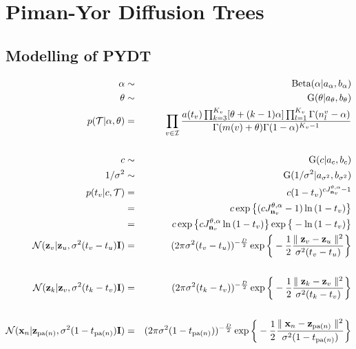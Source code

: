 \documentclass{article}
\begin{document}
\section{Piman-Yor Diffusion Trees}
\subsection{Modelling of PYDT}	

	\begin{eqnarray}
		\alpha &\sim& \textrm{Beta}(\alpha | a_\alpha, b_\alpha) \\ 
		\theta &\sim& \textrm{G}(\theta | a_\theta, b_\theta) \\
		p(\mathcal{T}|\alpha, \theta) &=& \prod_{v \in \mathcal{I}} \frac{a(t_v) \prod^{K_v}_{k=3}[\theta + (k - 1)\alpha] \prod^{K_v}_{l=1} \Gamma(n^v_l - \alpha)}{\Gamma(m(v) + \theta) \Gamma(1 - \alpha)^{K_v - 1}} \nonumber \\
		\\
		c &\sim& \textrm{G}(c | a_c, b_c) \\
		1/\sigma^2 &\sim& \textrm{G}(1/\sigma^2 | a_{\sigma^2}, b_{\sigma^2}) \\
		p(t_v | c, \mathcal{T}) &=& c(1-t_v)^{cJ^{\theta,\alpha}_{\bold{n}_v} - 1} \nonumber \\
		&=& c\exp \big\{ (cJ^{\theta,\alpha}_{\bold{n}_v} - 1)\ln{(1-t_v)} \big\} \nonumber \\
		&=& c\exp \big\{ cJ^{\theta,\alpha}_{\bold{n}_v}\ln{(1-t_v)} \big\} \exp \big\{-\ln{(1-t_v)} \big\} \\
		\mathcal{N}(\bold{z}_v | \bold{z}_u, \sigma^2(t_v - t_u)\bold{I}) &=& (2 \pi \sigma^2(t_v - t_u))^{-\frac{D}{2}} \exp \bigg\{-\frac{1}{2}\frac{\parallel \bold{z}_v - \bold{z}_u \parallel^2}{\sigma^2 (t_v - t_u)} \bigg\} \nonumber \\
		\\
		\mathcal{N}(\bold{z}_k | \bold{z}_v, \sigma^2(t_k - t_v)\bold{I}) &=& (2 \pi \sigma^2(t_k - t_v))^{-\frac{D}{2}} \exp \bigg\{-\frac{1}{2}\frac{\parallel \bold{z}_k - \bold{z}_v \parallel^2}{\sigma^2 (t_k - t_v)} \bigg\} \nonumber \\
		\\
		\mathcal{N}(\bold{x}_n | \bold{z}_{\text{pa}(n)}, \sigma^2(1 - t_{\text{pa}(n)})\bold{I}) &=& (2 \pi \sigma^2(1 - t_{\text{pa}(n)}))^{-\frac{D}{2}} \exp \bigg\{-\frac{1}{2}\frac{\parallel \bold{x}_n - \bold{z}_{\text{pa}(n)} \parallel^2}{\sigma^2 (1 - t_{\text{pa}(n)})} \bigg\} \nonumber \\
	\end{eqnarray}
	
\end{document}
